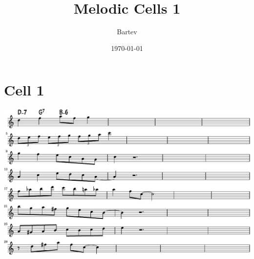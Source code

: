 \documentclass[11pt]{article}
\author{Bartev}
\date{\today}
\title{Melodic Cells 1}
\let\maketitle\relax %
\begin{document}
\maketitle
\tableofcontents


\section{Cell 1}
\label{sec:org0ae467f}
\begin{center}
\includegraphics[width=.98\linewidth]{cell-1.pdf}
\end{center}
\end{document}
